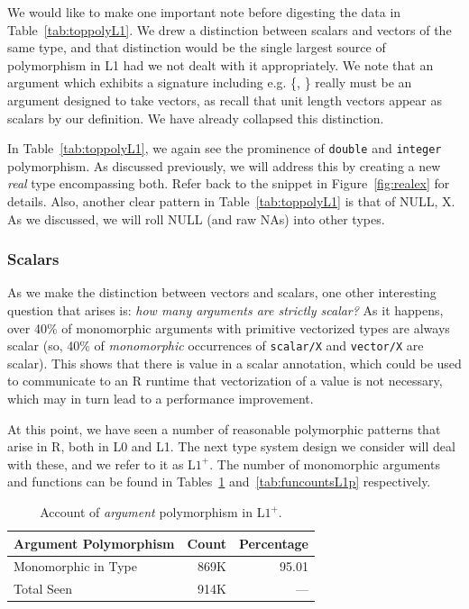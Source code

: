\documentclass[acmsmall,10pt,review,anonymous]{acmart}\settopmatter{printfolios=true,printccs=false,printacmref=false}
\begin{document}
We would like to make one important note before digesting the data in
Table~\ref{tab:toppolyL1}.  We drew a distinction between scalars and
vectors of the same type, and that distinction would be the single largest
source of polymorphism in L1 had we not dealt with it appropriately.  We
note that an argument which exhibits a signature including e.g. \{\sD, \D\}
really must be an argument designed to take vectors, as recall that unit
length vectors appear as scalars by our definition.  We have already
collapsed this distinction.

In Table~\ref{tab:toppolyL1}, we again see the prominence of {\tt double} and {\tt integer} polymorphism.
As discussed previously, we will address this by creating a new {\it real} type encompassing both.
Refer back to the snippet in Figure~\ref{fig:realex} for details.
Also, another clear pattern in Table~\ref{tab:toppolyL1} is that of NULL, X.
As we discussed, we will roll NULL (and raw NAs) into other types.

%
%
\subsubsection{Scalars}

As we make the distinction between vectors and scalars, one other
interesting question that arises is: {\it how many arguments are strictly
  scalar?}  As it happens, over 40\% of monomorphic arguments with primitive
vectorized types are always scalar (so, 40\% of {\it monomorphic}
occurrences of {\tt scalar/X} and {\tt vector/X} are scalar).  This shows
that there is value in a scalar annotation, which could be used to
communicate to an R runtime that vectorization of a value is not necessary,
which may in turn lead to a performance improvement.

At this point, we have seen a number of reasonable polymorphic patterns that arise in R, both in L0 and L1.
The next type system design we consider will deal with these, and we refer to it as L$1^{+}$.
The number of monomorphic arguments and functions can be found in Tables~\ref{tab:argcountsL1p} and~\ref{tab:funcountsL1p} respectively.

\begin{table}[ht]
\label{tab:argcountsL1p}
\centering
\begin{tabular}{lrr}
  \hline
 Argument Polymorphism & Count & Percentage \\
  \hline
  Monomorphic in Type & 869K & 95.01 \\
  Total Seen & 914K & --- \\
     \hline
\end{tabular}
\caption{Account of {\it argument} polymorphism in L$1^{+}$.}
\end{table}
\end{document}

